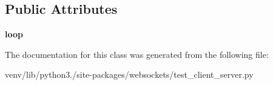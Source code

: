 \subsection*{Public Attributes}
\begin{DoxyCompactItemize}
\item 
\mbox{\label{classwebsockets_1_1test__client__server_1_1_client_server_origin_tests_a423156d7ccb96185e9a6d6d146e62534}} 
{\bfseries loop}
\end{DoxyCompactItemize}


The documentation for this class was generated from the following file\+:\begin{DoxyCompactItemize}
\item 
venv/lib/python3./site-\/packages/websockets/test\+\_\+client\+\_\+server.\+py\end{DoxyCompactItemize}
